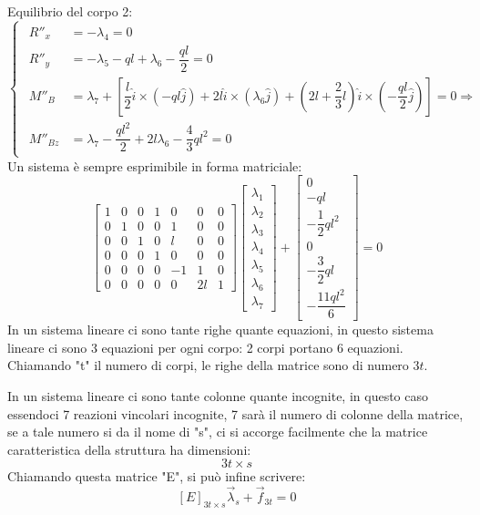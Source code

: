 \documentclass{article}
\begin{document}
\begin{adjustwidth}{2in}{}
Equilibrio del corpo 2: 
\[ \begin{cases}
	\begin{aligned}
		R''_x & = - \lambda_4 = 0 \\
		R''_y & = - \lambda_5 - ql +\lambda_6 - \dfrac{ql}{2} = 0\\
		M''_B & = \lambda_7 + \left[ \dfrac{l}{2}\hat{i}\times (-ql\hat{j}) + 2l\hat{i}\times (\lambda_6\hat{j}) + (2l+\dfrac{2}{3}l)\hat{i}\times (-\dfrac{ql}{2}\hat{j})\right]  = 0 \Rightarrow \\ M''_{Bz} & = \lambda_7 -\dfrac{ql^2}{2} + 2l\lambda_6 - \dfrac{4}{3}ql^2 =0
	\end{aligned}
\end{cases}\]
Un sistema è sempre esprimibile in forma matriciale: 
\[  
\left[ \begin{array}{ccccccc}
	1 & 0 & 0 & 1 & 0 & 0 & 0 \\
	0 & 1 & 0 & 0 & 1 & 0 & 0 \\
	0 & 0 & 1 & 0 & l & 0 & 0 \\
	0 & 0 & 0 & 1 & 0 & 0 & 0 \\
	0 & 0 & 0 & 0 & -1 & 1 & 0 \\
	0 & 0 & 0 & 0 & 0 & 2l & 1
\end{array}\right] \left[ \begin{array}{c}
\lambda_1 \\
\lambda_2 \\
\lambda_3 \\
\lambda_4 \\
\lambda_5 \\
\lambda_6 \\
\lambda_7
\end{array}\right] + \left[ 
\begin{array}{c}
0 \\
-ql \\
-\dfrac{1}{2}ql^2 \\
0 \\
-\dfrac{3}{2}ql \\
-\dfrac{11ql^2}{6}
\end{array}  \right] = 0
\]
In un sistema lineare ci sono tante righe quante equazioni, in questo sistema lineare ci sono 3 equazioni per ogni corpo: 2 corpi portano 6 equazioni. Chiamando "t" il numero di corpi, le righe della matrice sono di numero $3t$. 

In un sistema lineare ci sono tante colonne quante incognite, in questo caso essendoci 7 reazioni vincolari incognite, 7 sarà il numero di colonne della matrice, se a tale numero si da il nome di "s", ci si accorge facilmente che la matrice caratteristica della struttura ha dimensioni:
\[3t\times s\]
Chiamando questa matrice "E", si può infine scrivere: 
\[ [E]_{3t\times s}\vec{\lambda}_s + \vec{f}_{3t} = 0\]


\end{adjustwidth}
\end{document}
